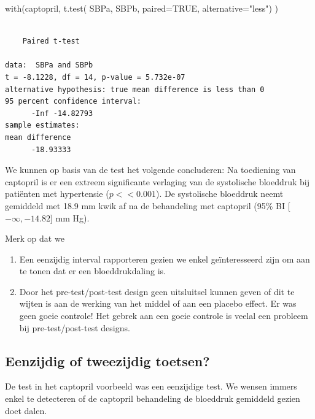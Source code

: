 \documentclass[
  dutch,
  letterpaper,
  12pt]{book}
\newenvironment{Shaded}{\begin{snugshade}}{\end{snugshade}}
\newcommand{\AttributeTok}[1]{\textcolor[rgb]{0.40,0.45,0.13}{#1}}
\newcommand{\ConstantTok}[1]{\textcolor[rgb]{0.56,0.35,0.01}{#1}}
\newcommand{\FunctionTok}[1]{\textcolor[rgb]{0.28,0.35,0.67}{#1}}
\newcommand{\NormalTok}[1]{\textcolor[rgb]{0.00,0.23,0.31}{#1}}
\newcommand{\StringTok}[1]{\textcolor[rgb]{0.13,0.47,0.30}{#1}}
\providecommand{\tightlist}{%
  \setlength{\itemsep}{0pt}\setlength{\parskip}{0pt}}
\theoremstyle{definition}
\theoremstyle{definition}
\theoremstyle{definition}
\theoremstyle{remark}
\begin{document}
\begin{Shaded}
\begin{Highlighting}[]
\FunctionTok{with}\NormalTok{(captopril,}
       \FunctionTok{t.test}\NormalTok{(}
\NormalTok{             SBPa,}
\NormalTok{             SBPb,}
             \AttributeTok{paired=}\ConstantTok{TRUE}\NormalTok{,}
             \AttributeTok{alternative=}\StringTok{"less"}\NormalTok{)}
\NormalTok{         )}
\end{Highlighting}
\end{Shaded}

\begin{verbatim}

    Paired t-test

data:  SBPa and SBPb
t = -8.1228, df = 14, p-value = 5.732e-07
alternative hypothesis: true mean difference is less than 0
95 percent confidence interval:
      -Inf -14.82793
sample estimates:
mean difference 
      -18.93333 
\end{verbatim}

We kunnen op basis van de test het volgende concluderen: Na toediening
van captopril is er een extreem significante verlaging van de
systolische bloeddruk bij patiënten met hypertensie (\(p << 0.001\)). De
systolische bloeddruk neemt gemiddeld met 18.9 mm kwik af na de
behandeling met captopril (95\% BI {[}\(-\infty,-14.82\){]} mm Hg).

Merk op dat we

\begin{enumerate}
\def\labelenumi{\arabic{enumi}.}
\tightlist
\item
  Een eenzijdig interval rapporteren gezien we enkel geïnteresseerd zijn
  om aan te tonen dat er een bloeddrukdaling is.
\item
  Door het pre-test/post-test design geen uitsluitsel kunnen geven of
  dit te wijten is aan de werking van het middel of aan een placebo
  effect. Er was geen goeie controle! Het gebrek aan een goeie controle
  is veelal een probleem bij pre-test/post-test designs.
\end{enumerate}

\subsection{Eenzijdig of tweezijdig
toetsen?}\label{eenzijdig-of-tweezijdig-toetsen}

De test in het captopril voorbeeld was een eenzijdige test. We wensen
immers enkel te detecteren of de captopril behandeling de bloeddruk
gemiddeld gezien doet dalen.
\end{document}
